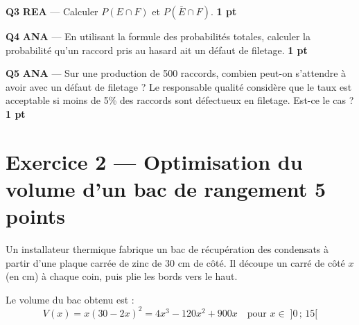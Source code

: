 \documentclass[a4paper,11pt]{article}
\newcommand{\pts}[1]{\hfill\textcolor{gris}{\small\textbf{#1}}}
\newcommand{\comp}[1]{\colorbox{blue!10}{\scriptsize\textbf{#1}}}
\begin{document}
\textbf{Q3} \comp{REA} — Calculer $P(E \cap F)$ et $P(\overline{E} \cap F)$. \pts{1 pt}

\begin{reponsebox}[3cm]
\dotfill

\dotfill

\dotfill
\end{reponsebox}

\textbf{Q4} \comp{ANA} — En utilisant la formule des probabilités totales, calculer la probabilité qu'un raccord pris au hasard ait un défaut de filetage. \pts{1 pt}

\begin{reponsebox}[3cm]
\dotfill

\dotfill

\dotfill
\end{reponsebox}

\textbf{Q5} \comp{ANA} — Sur une production de 500 raccords, combien peut-on s'attendre à avoir avec un défaut de filetage ? Le responsable qualité considère que le taux est acceptable si moins de 5\% des raccords sont défectueux en filetage. Est-ce le cas ? \pts{1 pt}

\begin{reponsebox}[3cm]
\dotfill

\dotfill

\dotfill
\end{reponsebox}

\newpage

\section*{Exercice 2 — Optimisation du volume d'un bac de rangement \pts{5 points}}

\begin{contextebox}
Un installateur thermique fabrique un bac de récupération des condensats à partir d'une plaque carrée de zinc de 30 cm de côté. Il découpe un carré de côté $x$ (en cm) à chaque coin, puis plie les bords vers le haut.

Le volume du bac obtenu est :
\[V(x) = x(30 - 2x)^2 = 4x^3 - 120x^2 + 900x \quad \text{pour } x \in \;]0\,;\,15[\]
\end{contextebox}
\end{document}
